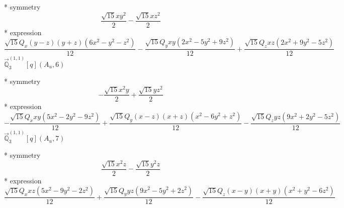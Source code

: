 \documentclass[fleqn,8pt]{jsarticle}
\begin{document}
\noindent\quad ** symmetry
\begin{dmath*}
\frac{\sqrt{15} x y^{2}}{2} - \frac{\sqrt{15} x z^{2}}{2}
\end{dmath*}
\noindent\quad ** expression
\begin{dmath*}
\frac{\sqrt{15} Q_{x} \left(y - z\right) \left(y + z\right) \left(6 x^{2} - y^{2} - z^{2}\right)}{12} - \frac{\sqrt{15} Q_{y} x y \left(2 x^{2} - 5 y^{2} + 9 z^{2}\right)}{12} + \frac{\sqrt{15} Q_{z} x z \left(2 x^{2} + 9 y^{2} - 5 z^{2}\right)}{12}
\end{dmath*}
\noindent\quad $\vec{\mathbb{Q}}_{3}^{(1,1)}[q](A_{u},6)$

\noindent\quad ** symmetry
\begin{dmath*}
- \frac{\sqrt{15} x^{2} y}{2} + \frac{\sqrt{15} y z^{2}}{2}
\end{dmath*}
\noindent\quad ** expression
\begin{dmath*}
- \frac{\sqrt{15} Q_{x} x y \left(5 x^{2} - 2 y^{2} - 9 z^{2}\right)}{12} + \frac{\sqrt{15} Q_{y} \left(x - z\right) \left(x + z\right) \left(x^{2} - 6 y^{2} + z^{2}\right)}{12} - \frac{\sqrt{15} Q_{z} y z \left(9 x^{2} + 2 y^{2} - 5 z^{2}\right)}{12}
\end{dmath*}
\noindent\quad $\vec{\mathbb{Q}}_{3}^{(1,1)}[q](A_{u},7)$

\noindent\quad ** symmetry
\begin{dmath*}
\frac{\sqrt{15} x^{2} z}{2} - \frac{\sqrt{15} y^{2} z}{2}
\end{dmath*}
\noindent\quad ** expression
\begin{dmath*}
\frac{\sqrt{15} Q_{x} x z \left(5 x^{2} - 9 y^{2} - 2 z^{2}\right)}{12} + \frac{\sqrt{15} Q_{y} y z \left(9 x^{2} - 5 y^{2} + 2 z^{2}\right)}{12} - \frac{\sqrt{15} Q_{z} \left(x - y\right) \left(x + y\right) \left(x^{2} + y^{2} - 6 z^{2}\right)}{12}
\end{dmath*}
\end{document}
